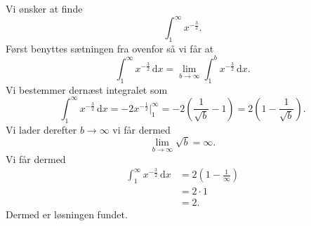 \begin{eks} 
  Vi ønsker at finde
  \[ 
  \int_{1}^{\infty} x^{-\frac{3}{2}} 
  .\]
  \bigbreak
  Først benyttes sætningen fra ovenfor så vi får at
  \[ 
    \int_{1}^{\infty} x^{-\frac{3}{2}} \, \mathrm{d}x = \lim_{b \to \infty} \int_{1}^{b} x^{-\frac{3}{2}}\, \mathrm{d}x 
  .\]
  Vi bestemmer dernæst integralet som
  \[ 
  \int_{1}^{\infty } x^{-\frac{3}{2}} \, \mathrm{d}x = -2 x^{-\frac{1}{2}} \bigg|_{1}^{\infty} = -2 \left( \frac{1}{\sqrt{b}} - 1 \right) = 2 \left( 1 - \frac{1}{\sqrt{b}}\right)
  .\]
  Vi lader derefter $b \to \infty$ vi får dermed
  \[
  \lim_{b \to \infty} \sqrt{b} = \infty
  .\]
  Vi får dermed
  \begin{align*}
  \int_{1}^{\infty} x^{-\frac{3}{2}} \, \mathrm{d}x &= 2 \left( 1 - \frac{1}{\infty } \right) \\
  &= 2 \cdot 1 \\
  &= 2
  .\end{align*}
  Dermed er løsningen fundet.
\end{eks}
